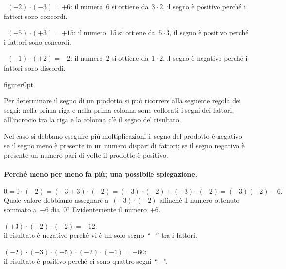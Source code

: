  \begin{esempio}
~\((-2)\cdot(-3)=+6\): il numero~6 si ottiene da~\(3\cdot2\), il segno è 
positivo 
perché i fattori sono concordi.
 \end{esempio}
 \begin{esempio}
~\((+5)\cdot(+3)=+15\): il numero~15 si ottiene da~\(5\cdot3\), il segno è 
positivo 
perché i fattori sono concordi.
 \end{esempio}
 \begin{esempio}
~\((-1)\cdot(+2)=-2\): il numero~2 si ottiene da~\(1\cdot2\), il segno è 
negativo 
perché i fattori sono discordi.
 \end{esempio}


\begin{wrapfloat}{figure}{r}{0pt}

\end{wrapfloat}
Per determinare il segno di un prodotto si può ricorrere alla seguente 
regola 
dei segni: nella prima riga e
nella prima colonna sono collocati i segni dei fattori, all'incrocio tra la 
riga 
e la colonna c'è il segno
del risultato.

Nel caso si debbano eseguire più moltiplicazioni il segno del prodotto è 
negativo se il segno meno è presente
in un numero dispari di fattori; se il segno negativo è presente un numero 
pari 
di volte il prodotto è positivo.

\paragraph{Perché meno per meno fa più; una possibile spiegazione.}
\[0=0\cdot (-2) = (-3+3)\cdot (-2) = 
(-3)\cdot(-2)+(+3)\cdot(-2)=(-3)(-2)-6.\]
Quale valore dobbiamo assegnare a~\((-3)\cdot(-2)\) affinché il numero 
ottenuto 
sommato a~\(-6\) dia~0?
Evidentemente il numero~\(+6\).

 \begin{esempio}
\((+3)\cdot (+2)\cdot (-2) =-12\): \\
il risultato è negativo perché vi è un solo segno~``\(-\)'' tra i fattori.
 \end{esempio}

 \begin{esempio}
\((-2)\cdot (-3)\cdot (+5)\cdot (-2)\cdot (-1) = +60\): \\ 
il risultato è positivo perché ci sono quattro segni~``\(-\)''.
 \end{esempio}


